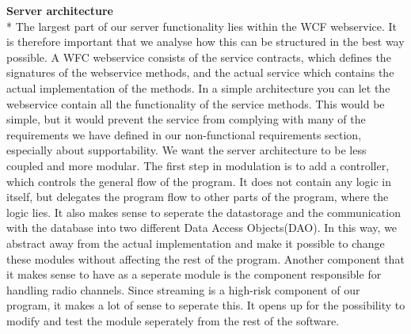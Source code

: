 \documentclass[a4paper,11pt,report]{article}
\begin{document}
\textbf{Server architecture} \\*
The largest part of our server functionality lies within the WCF webservice. It is therefore important that we analyse how this can be structured in the best way possible.
A WFC webservice consists of the service contracts, which defines the signatures of the webservice methods, and the actual service which contains the actual implementation of the methods. In a simple architecture you can let the webservice contain all the functionality of the service methods. This would be simple, but it would prevent the service from complying with many of the requirements we have defined in our non-functional requirements section, especially about supportability. We want the server architecture to be less coupled and more modular. The first step in modulation is to add a controller, which controls the general flow of the program. It does not contain any logic in itself, but delegates the program flow to other parts of the program, where the logic lies. It also makes sense to seperate the datastorage and the communication with the database into two different Data Access Objects(DAO). In this way, we abstract away from the actual implementation and make it possible to change these modules without affecting the rest of the program. Another component that it makes sense to have as a seperate module is the component responsible for handling radio channels. Since streaming is a high-risk component of our program, it makes a lot of sense to seperate this. It opens up for the possibility to modify and test the module seperately from the rest of the software. 
\end{document}
